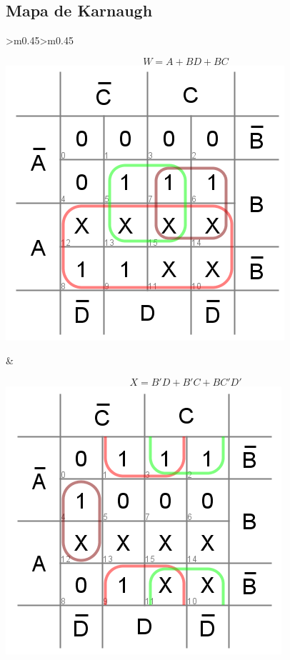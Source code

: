 \documentclass{article}
\begin{document}
\subsection{Mapa de Karnaugh}
\begin{center}
\begin{tabular}{>{\centering\arraybackslash}m{0.45\textwidth}>{\centering\arraybackslash}m{0.45\textwidth}}
\begin{minipage}[t]{\linewidth}
    \centering
    $$W = A + BD + BC$$ 
    \includegraphics[width=0.8\linewidth]{xs3-kmap-W.png}
\end{minipage}
&
\begin{minipage}[t]{\linewidth}
    \centering
    $$X = B'D + B'C + BC'D'$$ 
    \includegraphics[width=0.8\linewidth]{xs3-kmap-X.png}

\end{minipage}
\end{tabular}
\end{center}
\end{document}
